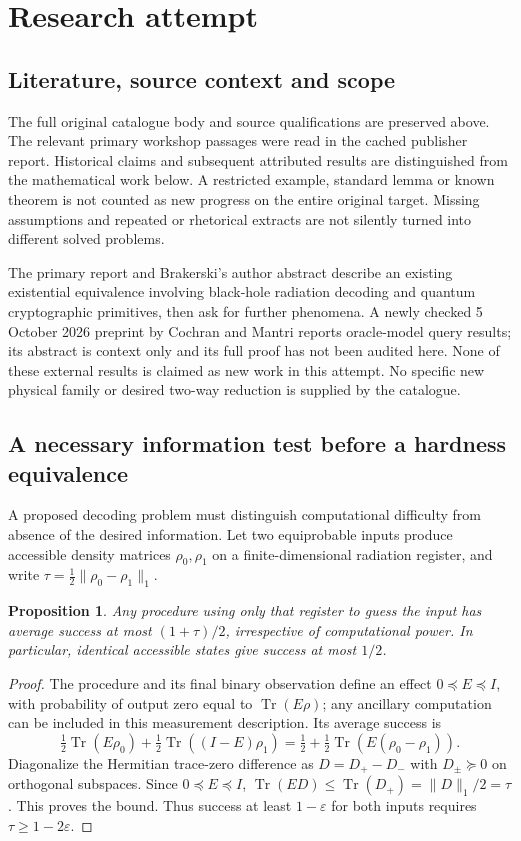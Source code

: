 \documentclass[11pt]{article}
\newtheorem{proposition}{Proposition}
\begin{document}
\section{Research attempt}
\subsection{Literature, source context and scope}
The full original catalogue body and source qualifications are preserved above. The relevant primary workshop passages were read in the cached publisher report. Historical claims and subsequent attributed results are distinguished from the mathematical work below. A restricted example, standard lemma or known theorem is not counted as new progress on the entire original target. Missing assumptions and repeated or rhetorical extracts are not silently turned into different solved problems.

The primary report and Brakerski's author abstract describe an existing existential equivalence involving black-hole radiation decoding and quantum cryptographic primitives, then ask for further phenomena. A newly checked 5 October 2026 preprint by Cochran and Mantri reports oracle-model query results; its abstract is context only and its full proof has not been audited here. None of these external results is claimed as new work in this attempt. No specific new physical family or desired two-way reduction is supplied by the catalogue.
\subsection{A necessary information test before a hardness equivalence}
A proposed decoding problem must distinguish computational difficulty from absence of the desired information. Let two equiprobable inputs produce accessible density matrices $\rho_0,\rho_1$ on a finite-dimensional radiation register, and write $\tau=\tfrac12\|\rho_0-\rho_1\|_1$.
\begin{proposition}
Any procedure using only that register to guess the input has average success at most $(1+\tau)/2$, irrespective of computational power. In particular, identical accessible states give success at most $1/2$.
\end{proposition}
\begin{proof}
The procedure and its final binary observation define an effect $0\preceq E\preceq I$, with probability of output zero equal to $\operatorname{Tr}(E\rho)$; any ancillary computation can be included in this measurement description. Its average success is
\[
 \tfrac12\operatorname{Tr}(E\rho_0)+\tfrac12\operatorname{Tr}((I-E)\rho_1)
 =\tfrac12+\tfrac12\operatorname{Tr}(E(\rho_0-\rho_1)).
\]
Diagonalize the Hermitian trace-zero difference as $D=D_+-D_-$ with $D_\pm\succeq0$ on orthogonal subspaces. Since $0\preceq E\preceq I$, $\operatorname{Tr}(ED)\le\operatorname{Tr}(D_+)=\|D\|_1/2=\tau$. This proves the bound. Thus success at least $1-\varepsilon$ for both inputs requires $\tau\ge1-2\varepsilon$.
\end{proof}
\end{document}
